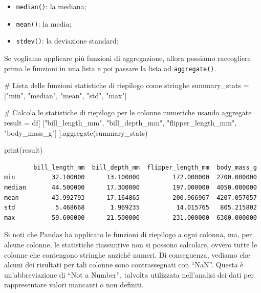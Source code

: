 \documentclass[
  letterpaper,
  krantz2]{{[}./krantz{]}}
\newenvironment{Shaded}{\begin{snugshade}}{\end{snugshade}}
\newcommand{\BuiltInTok}[1]{\textcolor[rgb]{0.00,0.23,0.31}{#1}}
\newcommand{\CommentTok}[1]{\textcolor[rgb]{0.37,0.37,0.37}{#1}}
\newcommand{\NormalTok}[1]{\textcolor[rgb]{0.00,0.23,0.31}{#1}}
\newcommand{\OperatorTok}[1]{\textcolor[rgb]{0.37,0.37,0.37}{#1}}
\newcommand{\StringTok}[1]{\textcolor[rgb]{0.13,0.47,0.30}{#1}}
\providecommand{\tightlist}{%
  \setlength{\itemsep}{0pt}\setlength{\parskip}{0pt}}\usepackage{longtable,booktabs,array}
\begin{document}
\begin{itemize}
\tightlist
\item
  \texttt{median()}: la mediana;
\item
  \texttt{mean()}: la media;
\item
  \texttt{stdev()}: la deviazione standard;
\end{itemize}

Se vogliamo applicare più funzioni di aggregazione, allora possiamo
raccogliere prima le funzioni in una lista e poi passare la lista ad
\texttt{aggregate()}.

\begin{Shaded}
\begin{Highlighting}[]
\CommentTok{\# Lista delle funzioni statistiche di riepilogo come stringhe}
\NormalTok{summary\_stats }\OperatorTok{=}\NormalTok{ [}\StringTok{"min"}\NormalTok{, }\StringTok{"median"}\NormalTok{, }\StringTok{"mean"}\NormalTok{, }\StringTok{"std"}\NormalTok{, }\StringTok{"max"}\NormalTok{]}

\CommentTok{\# Calcola le statistiche di riepilogo per le colonne numeriche usando aggregate}
\NormalTok{result }\OperatorTok{=}\NormalTok{ df[}
\NormalTok{    [}\StringTok{"bill\_length\_mm"}\NormalTok{, }\StringTok{"bill\_depth\_mm"}\NormalTok{, }\StringTok{"flipper\_length\_mm"}\NormalTok{, }\StringTok{"body\_mass\_g"}\NormalTok{]}
\NormalTok{].aggregate(summary\_stats)}

\BuiltInTok{print}\NormalTok{(result)}
\end{Highlighting}
\end{Shaded}

\begin{verbatim}
        bill_length_mm  bill_depth_mm  flipper_length_mm  body_mass_g
min          32.100000      13.100000         172.000000  2700.000000
median       44.500000      17.300000         197.000000  4050.000000
mean         43.992793      17.164865         200.966967  4207.057057
std           5.468668       1.969235          14.015765   805.215802
max          59.600000      21.500000         231.000000  6300.000000
\end{verbatim}

Si noti che Pandas ha applicato le funzioni di riepilogo a ogni colonna,
ma, per alcune colonne, le statistiche riassuntive non si possono
calcolare, ovvero tutte le colonne che contengono stringhe anziché
numeri. Di conseguenza, vediamo che alcuni dei risultati per tali
colonne sono contrassegnati con ``NaN''. Questa è un'abbreviazione di
``Not a Number'', talvolta utilizzata nell'analisi dei dati per
rappresentare valori mancanti o non definiti.
\end{document}
